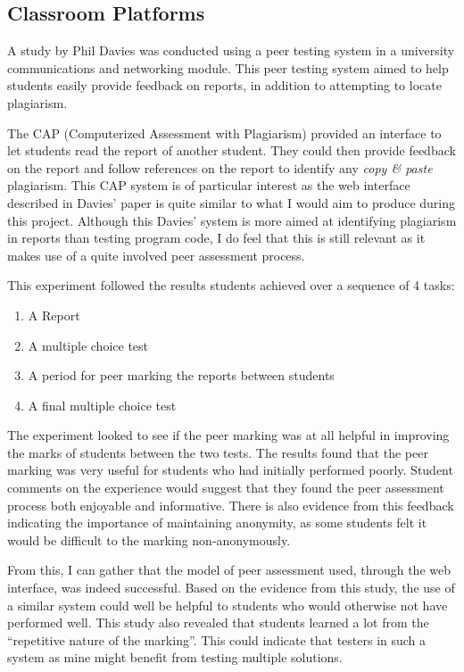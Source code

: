 \documentclass[a4paper,11pt]{report}
\begin{document}
\subsection{Classroom Platforms}
A study by Phil Davies\cite{davies_computerized_2000} was conducted using a peer testing system in a university communications and networking module. This peer testing system aimed to help students easily provide feedback on reports, in addition to attempting to locate plagiarism.\par
The CAP (Computerized Assessment with Plagiarism) provided an interface to let students read the report of another student. They could then provide feedback on the report and follow references on the report to identify any \textit{copy \& paste} plagiarism. This CAP system is of particular interest as the web interface described in Davies' paper is quite similar to what I would aim to produce during this project. Although this Davies' system is more aimed at identifying plagiarism in reports than testing program code, I do feel that this is still relevant as it makes use of a quite involved peer assessment process.\par
This experiment followed the results students achieved over a sequence of 4 tasks:
\begin{enumerate}
\item A Report
\item A multiple choice test
\item A period for peer marking the reports between students
\item A final multiple choice test
\end{enumerate}
The experiment looked to see if the peer marking was at all helpful in improving the marks of students between the two tests. The results found that the peer marking was very useful for students who had initially performed poorly. Student comments on the experience would suggest that they found the peer assessment process both enjoyable and informative. There is also evidence from this feedback indicating the importance of maintaining anonymity, as some students felt it would be difficult to the marking non-anonymously.\par
From this, I can gather that the model of peer assessment used, through the web interface, was indeed successful. Based on the evidence from this study, the use of a similar system could well be helpful to students who would otherwise not have performed well. This study also revealed that students learned a lot from the ``repetitive nature of the marking''. This could indicate that testers in such a system as mine might benefit from testing multiple solutions.\par
\end{document}
